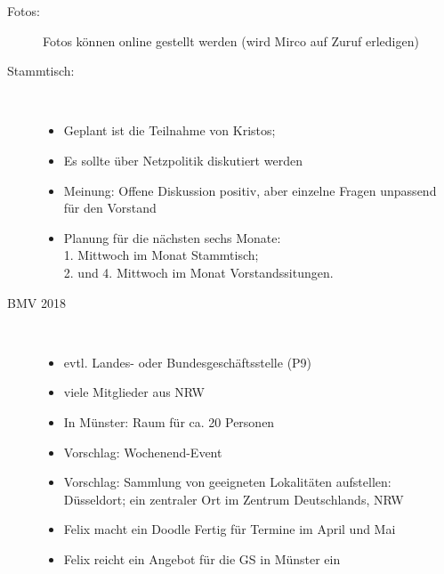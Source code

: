 \begin{Protokoll}
    \begin{description}
        \item[Fotos:] Fotos können online gestellt werden (wird Mirco auf Zuruf erledigen)
        \item[Stammtisch:] \
            \begin{itemize} 
                \item Geplant ist die Teilnahme von Kristos; 
                \item Es sollte über Netzpolitik diskutiert werden
                \item Meinung: Offene Diskussion positiv, aber einzelne Fragen unpassend für den Vorstand
                \item Planung für die nächsten sechs Monate: \\
                    1. Mittwoch im Monat Stammtisch; \\
                    2. und 4. Mittwoch im Monat Vorstandssitungen. 
            \end{itemize}
        \item[BMV 2018]\
             \begin{itemize} 
                \item evtl. Landes- oder Bundesgeschäftsstelle (P9)
                \item viele Mitglieder aus NRW
                \item In Münster: Raum für ca. 20 Personen
                \item Vorschlag: Wochenend-Event
                \item Vorschlag: Sammlung von geeigneten Lokalitäten aufstellen: {Düsseldort; ein zentraler Ort im Zentrum Deutschlands, NRW}
                \item Felix macht ein Doodle Fertig für Termine im April und Mai
                \item Felix reicht ein Angebot für die GS in Münster ein
             \end{itemize}
    \end{description}
    
  
    
    
\end{Protokoll}


